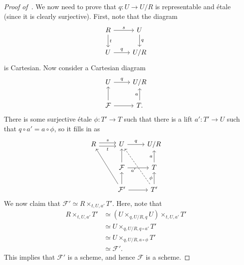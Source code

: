 \documentclass{amsart}
\theoremstyle{definition}
\theoremstyle{remark}
\theoremstyle{plain}
\theoremstyle{definition}
\theoremstyle{remark}
\newcommand{\mc}[1]{\mathcal{#1}}
\newcommand{\1}{\mathbf{1}}
\newcommand{\2}{\mathbf{2}}
\newcommand{\3}{\mathbf{3}}
\begin{document}
\begin{proof}[Proof of~]
    We now need to prove that \(q \colon U \to U/R\) is representable and \'etale (since it is clearly surjective). First, note that the diagram
    \begin{equation*}
    \begin{tikzcd}
        R \ar{r}{s} \ar{d}{t} & U \ar{d}{q} \\
        U \ar{r}{q} & U/R
    \end{tikzcd}
    \end{equation*}
    is Cartesian. Now consider a Cartesian diagram
    \begin{equation*}
    \begin{tikzcd}
        U \ar{r}{q} & U/R \\
        \mc{F} \ar{r} \ar{u} & T. \ar{u}{a}
    \end{tikzcd}
    \end{equation*}
    There is some surjective \'etale \(\phi \colon T' \to T\) such that there is a lift \(a' \colon T' \to U\) such that \(q \circ a' = a \circ \phi\), so it fills in as
    \begin{equation*}
    \begin{tikzcd}
        R \ar[shift left]{r}{s} \ar[shift right]{r}[swap]{t} & U \ar{r}{q} & U/R \\
        & \mc{F} \ar{r} \ar{u} & T \ar{u}{a} \\
        & \mc{F}' \ar{r} \ar{u} \ar{uul} & T' \ar{u}{\phi} \ar[dashrightarrow]{uul}{a'}
    \end{tikzcd}
    \end{equation*}
    We now claim that \(\mc{F}' \simeq R \times_{t,U,a'} T'\). Here, note that
    \begin{align*}
        R \times_{t,U,a'} T' &\simeq (U \times_{q, U/R,q} U) \times_{t,U,a'} T' \\
        &\simeq U \times_{q, U/R, q \circ a'} T' \\
        &\simeq U \times_{q, U/R, a \circ \phi} T' \\
        &\simeq \mc{F}'.
    \end{align*}
    This implies that \(\mc{F}'\) is a scheme, and hence \(\mc{F}\) is a scheme.
\end{proof}
\end{document}
